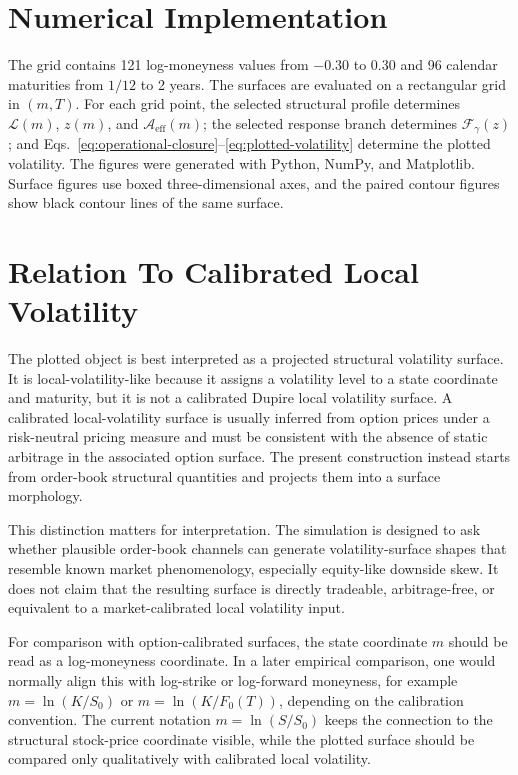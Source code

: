 \documentclass[11pt]{article}
\newcommand{\Aeff}{\mathcal A_{\mathrm{eff}}}
\newcommand{\Liq}{\mathcal L}
\newcommand{\Fresp}{\mathcal F}
\begin{document}
\section{Numerical Implementation}

The grid contains 121 log-moneyness values from \(-0.30\) to \(0.30\) and 96 calendar maturities from \(1/12\) to 2 years. The surfaces are evaluated on a rectangular grid in \((m,T)\). For each grid
point, the selected structural profile determines \(\Liq(m)\), \(z(m)\), and
\(\Aeff(m)\); the selected response branch determines \(\Fresp_\gamma(z)\);
and Eqs.~\eqref{eq:operational-closure}--\eqref{eq:plotted-volatility}
determine the plotted volatility. The figures were generated with Python,
NumPy, and Matplotlib. Surface figures use boxed three-dimensional axes, and
the paired contour figures show black contour lines of the same surface.

\section{Relation To Calibrated Local Volatility}

The plotted object is best interpreted as a projected structural volatility
surface. It is local-volatility-like because it assigns a volatility level to
a state coordinate and maturity, but it is not a calibrated Dupire local
volatility surface. A calibrated local-volatility surface is usually inferred
from option prices under a risk-neutral pricing measure and must be consistent
with the absence of static arbitrage in the associated option surface. The
present construction instead starts from order-book structural quantities and
projects them into a surface morphology.

This distinction matters for interpretation. The simulation is designed to
ask whether plausible order-book channels can generate volatility-surface
shapes that resemble known market phenomenology, especially equity-like
downside skew. It does not claim that the resulting surface is directly
tradeable, arbitrage-free, or equivalent to a market-calibrated local
volatility input.

For comparison with option-calibrated surfaces, the state coordinate \(m\)
should be read as a log-moneyness coordinate. In a later empirical comparison,
one would normally align this with log-strike or log-forward moneyness, for
example \(m=\ln(K/S_0)\) or \(m=\ln(K/F_0(T))\), depending on the calibration
convention. The current notation \(m=\ln(S/S_0)\) keeps the connection to the
structural stock-price coordinate visible, while the plotted surface should
be compared only qualitatively with calibrated local volatility.
\end{document}
